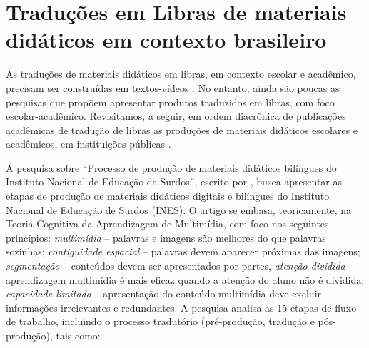 \documentclass[portuguese]{textolivre}
\begin{document}
\section{Traduções em Libras de materiais didáticos em contexto brasileiro}\label{sec-fmt-manuscrito}
As traduções de materiais didáticos em libras, em contexto escolar e acadêmico, precisam ser construídas em textos-vídeos \cite{lemos2023formacao}. No entanto, ainda são poucas as pesquisas que propõem apresentar produtos traduzidos em libras, com foco escolar-acadêmico. Revisitamos, a seguir, em ordem diacrônica de publicações acadêmicas de tradução de libras as produções de materiais didáticos escolares e acadêmicos, em instituições públicas \cite{galasso2018materiais,silva2020materiais,baalbaki2024acessibilidade}.

A pesquisa sobre “Processo de produção de materiais didáticos bilíngues do Instituto Nacional de Educação de Surdos”, escrito por \textcite{galasso2018materiais}, busca apresentar as etapas de produção de materiais didáticos digitais e bilíngues do Instituto Nacional de Educação de Surdos (INES). O artigo se embasa, teoricamente, na Teoria Cognitiva da Aprendizagem de Multimídia, com foco nos seguintes princípios: \textit{multimídia} – palavras e imagens são melhores do que palavras sozinhas; \textit{contiguidade espacial} – palavras devem aparecer próximas das imagens; \textit{segmentação} – conteúdos devem ser apresentados por partes, \textit{atenção dividida} – aprendizagem multimídia é mais eficaz quando a atenção do aluno não é dividida; \textit{capacidade limitada} – apresentação do conteúdo multimídia deve excluir informações irrelevantes e redundantes. A pesquisa analisa as 15 etapas de fluxo de trabalho, incluindo o processo tradutório (pré-produção, tradução e pós-produção), tais como: 
\end{document}
